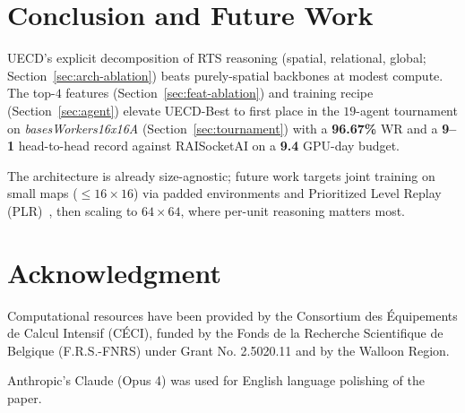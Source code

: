 \documentclass[conference]{IEEEtran}
\newcommand{\code}[1]{{\ttfamily\hyphenchar\font=45\relax #1}}
\begin{document}
\section{Conclusion and Future Work}
\label{sec:conclusion}

\code{UECD}'s explicit decomposition of RTS reasoning (spatial, relational, global; Section~\ref{sec:arch-ablation}) beats purely-spatial backbones at modest compute. The top-$4$ features (Section~\ref{sec:feat-ablation}) and training recipe (Section~\ref{sec:agent}) elevate \code{UECD-Best} to first place in the $19$-agent tournament on \emph{basesWorkers16x16A} (Section~\ref{sec:tournament}) with a \textbf{96.67\%} WR and a \textbf{9--1} head-to-head record against RAISocketAI on a \textbf{9.4} GPU-day budget.

The architecture is already size-agnostic; future work targets joint training on small maps ($\leq\!16{\times}16$) via padded environments and Prioritized Level Replay (PLR)~\cite{jiangPrioritizedLevelReplay2021}, then scaling to $64{\times}64$, where per-unit reasoning matters most.

\section*{Acknowledgment}

Computational resources have been provided by the Consortium des Équipements de Calcul Intensif (CÉCI), funded by the Fonds de la Recherche Scientifique de Belgique (F.R.S.-FNRS) under Grant No. 2.5020.11 and by the Walloon Region.

Anthropic's Claude (Opus 4) was used for English language polishing of the paper.


\end{document}
